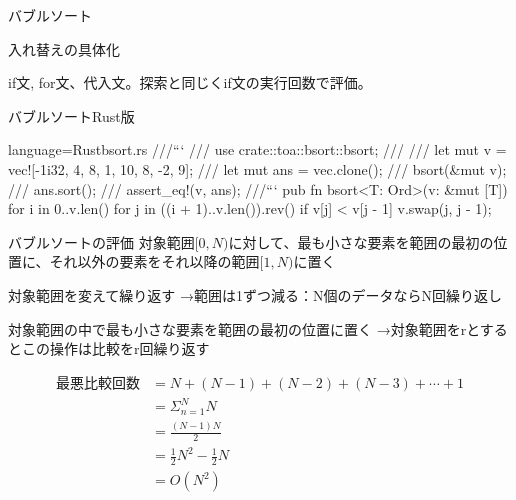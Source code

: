 \documentclass{beamer}
\begin{document}
\begin{frame}[fragile]{バブルソート}{}

\begin{algorithm}[H]
\BlankLine
{}
\caption[page]{入れ替えの具体化}
\end{algorithm}
\vfill
if文, for文、代入文。探索と同じくif文の実行回数で評価。
\end{frame}

\begin{frame}[fragile]{バブルソートRust版}{}
\begin{codeof}{language=Rust}{bsort.rs}
///```
/// use crate::toa::bsort::bsort;
///
/// let mut v = vec![-1i32, 4, 8, 1, 10, 8, -2, 9];
/// let mut ans = vec.clone();
/// bsort(&mut v);
/// ans.sort();
/// assert_eq!(v, ans);
///```
pub fn bsort<T: Ord>(v: &mut [T]) {
    for i in 0..v.len() {
        for j in ((i + 1)..v.len()).rev() {
            if v[j] < v[j - 1] {
                v.swap(j, j - 1);
            }
        }
    }
}
\end{codeof}
\end{frame}

\begin{frame}[fragile]{バブルソートの評価}{}
対象範囲$[0, N)$に対して、最も小さな要素を範囲の最初の位置に、それ以外の要素をそれ以降の範囲$[1, N)$に置く

対象範囲を変えて繰り返す
→範囲は1ずつ減る：N個のデータならN回繰り返し

対象範囲の中で最も小さな要素を範囲の最初の位置に置く
→対象範囲をrとするとこの操作は比較をr回繰り返す

\begin{align*}
最悪比較回数 &= N + (N - 1) + (N - 2) + (N - 3) + \cdots + 1 \\
&= \Sigma_{n=1}^{N}N \\
&= \frac{(N-1)N}{2} \\
&= \frac{1}{2}N^2 - \frac{1}{2}N \\
&= O(N^2)
\end{align*}
\end{frame}
\end{document}
